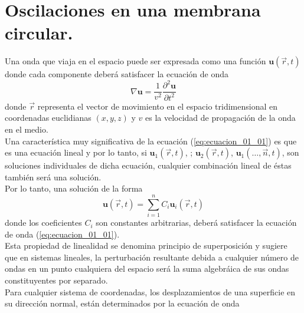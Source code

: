 \section*{Oscilaciones en una membrana circular.}
Una onda que viaja en el espacio puede ser expresada como una función $\mathbf{u}( \overrightarrow{r}, t)$ donde cada componente deberá satisfacer la ecuación de onda
\begin{equation}
\nabla \mathbf{u} = \dfrac{1}{v^{2}} \dfrac{\partial^{2} \mathbf{u}}{\partial t^{2}}
\label{eq:ecuacion_01_01}
\end{equation}
donde $\overrightarrow{r}$ representa el vector de movimiento en el espacio tridimensional en coordenadas euclidianas $(x, y, z)$ y $v$ es la velocidad de propagación de la onda en el medio.
\\
Una característica muy significativa de la ecuación (\ref{eq:ecuacion_01_01}) es que es una ecuación lineal y por lo tanto, si $\mathbf{u}_{1}(\overrightarrow{r}, t)$, ; $\mathbf{u}_{2}(\overrightarrow{r}, t)$, $\mathbf{u}_{1}( \ldots, \overrightarrow{n}, t)$, son soluciones individuales de dicha ecuación, cualquier combinación lineal de éstas también será una solución.
\\
Por lo tanto, una solución de la forma
\begin{equation}
\mathbf{u}(\overrightarrow{r},t) = \sum_{i=1}^{n} C_{i} \mathbf{u}_{i} (\overrightarrow{r},t)
\label{eq:ecuacion_01_02}
\end{equation}
donde los coeficientes $C_{i}$ son constantes arbitrarias, deberá satisfacer la ecuación de onda (\ref{eq:ecuacion_01_01}).
\\
Esta propiedad de linealidad se denomina principio de superposición y sugiere que en sistemas lineales, la perturbación resultante debida a cualquier número de ondas en un punto cualquiera del espacio será la suma algebráica de sus ondas
constituyentes por separado.
\\
Para cualquier sistema de coordenadas, los desplazamientos de una superficie en su dirección normal, están determinados
por la ecuación de onda

